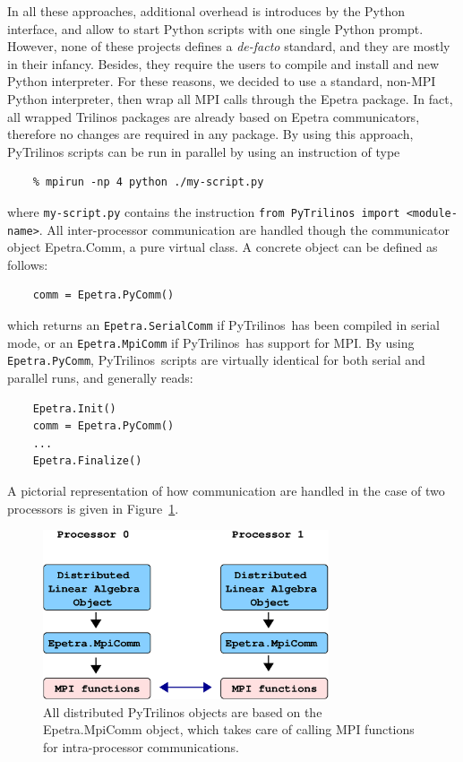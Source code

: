\documentclass[10pt,relax]{SANDreport}
\newcommand{\PyTrilinos}{{PyTrilinos}}
\begin{document}
In all these approaches, additional overhead is introduces by the
Python interface, and allow to start Python scripts with one
single Python prompt. However, none of these projects defines a {\sl de-facto}
standard, and they are mostly in their infancy. Besides, they require the
users to compile and install and new Python interpreter. For these reasons, we
decided to use a standard, non-MPI Python interpreter, then wrap all MPI calls
through the Epetra package. In fact, all wrapped Trilinos packages are already
based on Epetra communicators, therefore no changes are required in any
package. By using this approach, PyTrilinos scripts can be run in parallel
by using an instruction of type
\begin{verbatim}
    % mpirun -np 4 python ./my-script.py
\end{verbatim}
where {\tt my-script.py} contains the instruction {\tt from PyTrilinos
import <module-name>}.
All inter-processor communication are handled
though the communicator object Epetra.Comm, a pure virtual class. A
concrete object can be defined as follows:
\begin{verbatim}
    comm = Epetra.PyComm()
\end{verbatim}
which returns an {\tt Epetra.SerialComm} if \PyTrilinos\ has been compiled
in serial mode, or an {\tt Epetra.MpiComm} if \PyTrilinos\ has support for
MPI. By using {\tt Epetra.PyComm}, \PyTrilinos\ scripts are virtually
identical for both serial and parallel runs, and generally reads:
\begin{verbatim}
    Epetra.Init()
    comm = Epetra.PyComm()
    ...
    Epetra.Finalize()
\end{verbatim}
A pictorial representation of how communication are handled in
the case of two  processors is given in Figure~\ref{fig:distributed}.

\begin{figure}
\begin{center}
\includegraphics[height=5cm]{../UsersGuide/distributed_object.eps}
\caption{All distributed PyTrilinos objects are based on the Epetra.MpiComm
  object, which takes care of calling MPI functions for intra-processor
    communications.}
\label{fig:distributed}
\end{center}
\end{figure}
\end{document}
